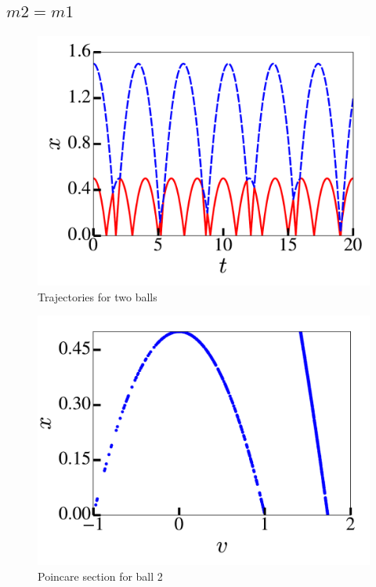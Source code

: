 \documentclass[pra,twocolumn,showpacs,amsmath,amssymb, aps, 10pt]{revtex4-1}
\begin{document}
\subsection{$m2 = m1$}
\begin{figure}
  \includegraphics[width=0.8\linewidth]{r1_0_traj}
  \caption{Trajectories for two balls}
  \label{fig:1-traj}
\end{figure}


\begin{figure}
  \includegraphics[width=0.8\linewidth]{r1_0_poincare}
  \caption{Poincare section for ball 2}
  \label{fig:1-poincare}
\end{figure}
\end{document}
